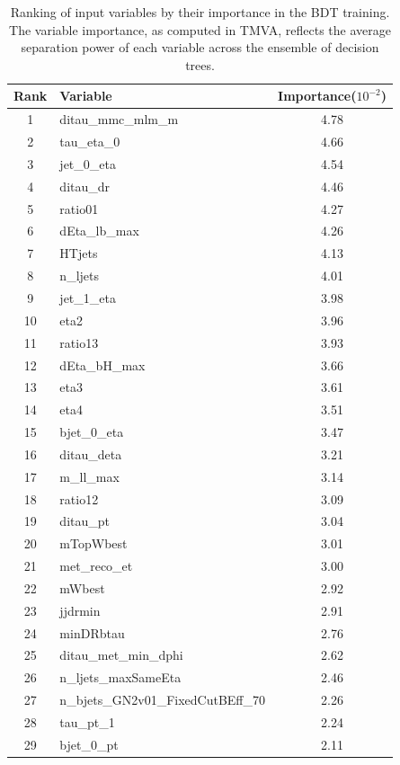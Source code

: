 \begin{table}[h]
  \centering
  \scriptsize
  \caption{Ranking of input variables by their importance in the BDT training. The variable importance, as computed in TMVA, reflects the average separation power of each variable across the ensemble of decision trees.}
  \label{ranking_tH_ttH}
  \renewcommand{\arraystretch}{1.05}
  \setlength{\tabcolsep}{10pt}
  \begin{tabular}{c l c}
    \toprule
    \textbf{Rank} & \textbf{Variable} & \textbf{Importance}\tiny{($10^{-2}$)} \\
    \midrule
     1 & ditau\_mmc\_mlm\_m & 4.78 \\
     2 & tau\_eta\_0 & 4.66 \\
     3 & jet\_0\_eta & 4.54 \\
     4 & ditau\_dr & 4.46 \\
     5 & ratio01 & 4.27 \\
     6 & dEta\_lb\_max & 4.26 \\
     7 & HTjets & 4.13 \\
     8 & n\_ljets & 4.01 \\
     9 & jet\_1\_eta & 3.98 \\
    10 & eta2 & 3.96 \\
    11 & ratio13 & 3.93 \\
    12 & dEta\_bH\_max & 3.66 \\
    13 & eta3 & 3.61 \\
    14 & eta4 & 3.51 \\
    15 & bjet\_0\_eta & 3.47 \\
    16 & ditau\_deta & 3.21 \\
    17 & m\_ll\_max & 3.14 \\
    18 & ratio12 & 3.09 \\
    19 & ditau\_pt & 3.04 \\
    20 & mTopWbest & 3.01 \\
    21 & met\_reco\_et & 3.00 \\
    22 & mWbest & 2.92 \\
    23 & jjdrmin & 2.91 \\
    24 & minDRbtau & 2.76 \\
    25 & ditau\_met\_min\_dphi & 2.62 \\
    26 & n\_ljets\_maxSameEta & 2.46 \\
    27 & n\_bjets\_GN2v01\_FixedCutBEff\_70 & 2.26 \\
    28 & tau\_pt\_1 & 2.24 \\
    29 & bjet\_0\_pt & 2.11 \\
    \bottomrule
  \end{tabular}
\end{table}


